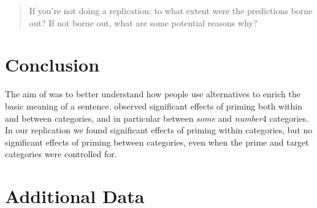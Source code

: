 \documentclass[10pt]{article}
\begin{document}
\begin{multicols}{2}
\begin{quote}
  If you're not doing a replication: to what extent were the predictions borne out? If not borne out, what are some potential reasons why?
\end{quote}






\section{Conclusion}
\label{sec:conclusion}

The aim of \textcite{Bott:2016aa} was to better understand how people use alternatives to enrich the basic meaning of a sentence.
\citeauthor{Bott:2016aa} observed significant effects of priming both within and between categories, and in particular between \emph{some} and \emph{number}4 categories.
In our replication we found significant effects of priming within categories, but no significant effects of priming between categories, even when the prime and target categories were controlled for.


\end{multicols}

\vfill
\printbibliography



\newpage
\appendix
\section{Additional Data}
\end{document}
